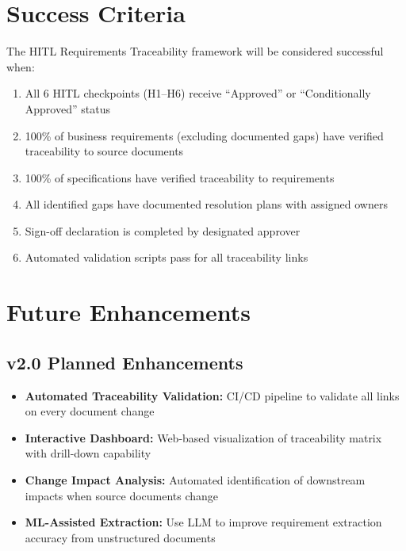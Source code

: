 \documentclass[11pt,a4paper,twoside]{report}
\begin{document}
\section{Success Criteria}
\label{sec:success-criteria}

The HITL Requirements Traceability framework will be considered
successful when:

\begin{enumerate}
\item All 6 HITL checkpoints (H1--H6) receive ``Approved'' or
``Conditionally Approved'' status
\item 100\% of business requirements (excluding documented gaps)
have verified traceability to source documents
\item 100\% of specifications have verified traceability to requirements
\item All identified gaps have documented resolution plans with
assigned owners
\item Sign-off declaration is completed by designated approver
\item Automated validation scripts pass for all traceability links
\end{enumerate}

\section{Future Enhancements}
\label{sec:future-enhancements}

\subsection{v2.0 Planned Enhancements}

\begin{itemize}[noitemsep]
\item \textbf{Automated Traceability Validation:} CI/CD pipeline to
validate all links on every document change
\item \textbf{Interactive Dashboard:} Web-based visualization of
traceability matrix with drill-down capability
\item \textbf{Change Impact Analysis:} Automated identification of
downstream impacts when source documents change
\item \textbf{ML-Assisted Extraction:} Use LLM to improve requirement
extraction accuracy from unstructured documents
\end{itemize}
\end{document}
